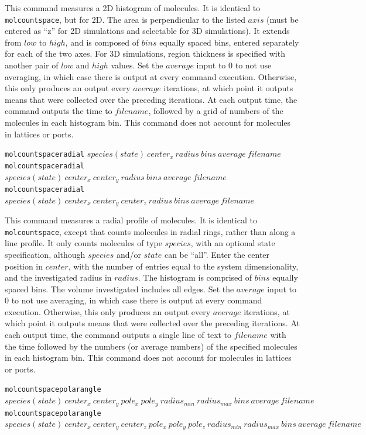 \documentclass {book}
\newcommand {\ttt} {\texttt}
\begin{document}
\begin{description}
This command measures a 2D histogram of molecules. It is identical to \ttt{molcountspace}, but for 2D. The area is perpendicular to the listed $axis$ (must be entered as ``z'' for 2D simulations and selectable for 3D simulations). It extends from $low$ to $high$, and is composed of $bins$ equally spaced bins, entered separately for each of the two axes. For 3D simulations, region thickness is specified with another pair of $low$ and $high$ values. Set the $average$ input to 0 to not use averaging, in which case there is output at every command execution. Otherwise, this only produces an output every $average$ iterations, at which point it outputs means that were collected over the preceding iterations. At each output time, the command outputs the time to $filename$, followed by a grid of numbers of the molecules in each histogram bin. This command does not account for molecules in lattices or ports.

\item{\ttt{molcountspaceradial} $species(state)\ center_x\ radius\ bins\ average\ filename$\\
\ttt{molcountspaceradial} $species(state)\ center_x\ center_y\ radius\ bins\ average\ filename$\\
\ttt{molcountspaceradial} $species(state)\ center_x\ center_y\ center_z\ radius\ bins\ average\ filename$}

This command measures a radial profile of molecules. It is identical to \ttt{molcountspace}, except that counts molecules in radial rings, rather than along a line profile. It only counts molecules of type $species$, with an optional state specification, although $species$ and/or $state$ can be ``all''. Enter the center position in $center$, with the number of entries equal to the system dimensionality, and the investigated radius in $radius$. The histogram is comprised of $bins$ equally spaced bins. The volume investigated includes all edges. Set the $average$ input to 0 to not use averaging, in which case there is output at every command execution. Otherwise, this only produces an output every $average$ iterations, at which point it outputs means that were collected over the preceding iterations. At each output time, the command outputs a single line of text to $filename$ with the time followed by the numbers (or average numbers) of the specified molecules in each histogram bin. This command does not account for molecules in lattices or ports.

\item{\ttt{molcountspacepolarangle} $species(state)\ center_x\ center_y\ pole_x\ pole_y\ radius_{min}\ radius_{max}\ bins\ average\ filename$\\
\ttt{molcountspacepolarangle} $species(state)\ center_x\ center_y\ center_z\ pole_x\ pole_y\ pole_z\ radius_{min}\ radius_{max}\ bins\ average\ filename$}


\end{description}
\end{document}
